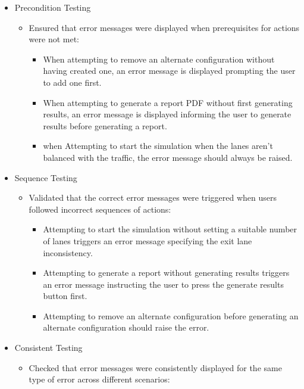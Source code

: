 \documentclass{article}
\begin{document}
        \begin{itemize}
            \item Precondition Testing
            \begin{itemize}
                \item Ensured that error messages were displayed when prerequisites for actions were not met:
                \begin{itemize}
                    \item When attempting to remove an alternate configuration without having created one, an error message is displayed prompting the user to add one first.
                    \item When attempting to generate a report PDF without first generating results, an error message is displayed informing the user to generate results before generating a report.
                    \item when Attempting to start the simulation when the lanes aren't balanced with the traffic, the error message should always be raised.
                \end{itemize}
            \end{itemize}
            \item Sequence Testing
            \begin{itemize}
                \item Validated that the correct error messages were triggered when users followed incorrect sequences of actions:
                \begin{itemize}
                    \item Attempting to start the simulation without setting a suitable number of lanes triggers an error message specifying the exit lane inconsistency.
                    \item Attempting to generate a report without generating results triggers an error message instructing the user to press the generate results button first.
                    \item Attempting to remove an alternate configuration before generating an alternate configuration should raise the error.
                \end{itemize}
            \end{itemize}
            \item Consistent Testing
            \begin{itemize}
                \item Checked that error messages were consistently displayed for the same type of error across different scenarios:

\end{itemize}
\end{itemize}
\end{document}
